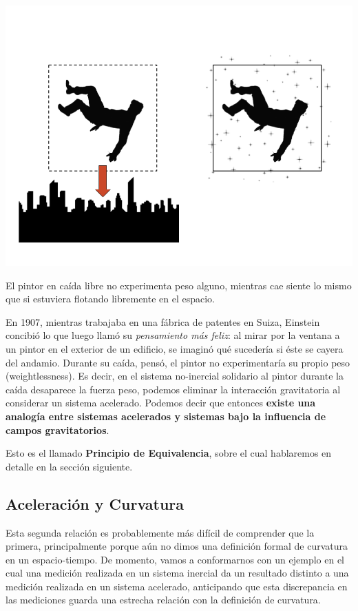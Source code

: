 \begin{marginfigure}
\captionsetup{type=figure}
    \centering
    \includegraphics[width=1.3\textwidth]{Im/happiestthought.png}
    \caption{El pintor en caída libre no experimenta peso alguno, mientras cae siente lo mismo que si estuviera flotando libremente en el espacio.}
    \label{fig:sen}
\end{marginfigure}
En 1907, mientras trabajaba en una fábrica de patentes en Suiza, Einstein concibió lo que luego llamó su \textit{pensamiento más feliz}: al mirar por la ventana a un pintor en el exterior de un edificio, se imaginó qué sucedería si éste se cayera del andamio. Durante su caída, pensó, el pintor no experimentaría su propio peso (weightlessness). Es decir, en el sistema no-inercial solidario al pintor durante la caída desaparece la fuerza peso, podemos eliminar la interacción gravitatoria al considerar un sistema acelerado. Podemos decir que entonces \textbf{existe una analogía entre sistemas acelerados y sistemas bajo la influencia de campos gravitatorios}.

Esto es el llamado \textbf{Principio de Equivalencia}, sobre el cual hablaremos en detalle en la sección siguiente.

\subsection*{\textbf{Aceleración y Curvatura}}

Esta segunda relación es probablemente más difícil de comprender que la primera, principalmente porque aún no dimos una definición formal de curvatura en un espacio-tiempo. De momento, vamos a conformarnos con un ejemplo en el cual una medición realizada en un sistema inercial da un resultado distinto a una medición realizada en un sistema acelerado, anticipando que esta discrepancia en las mediciones guarda una estrecha relación con la definición de curvatura.

